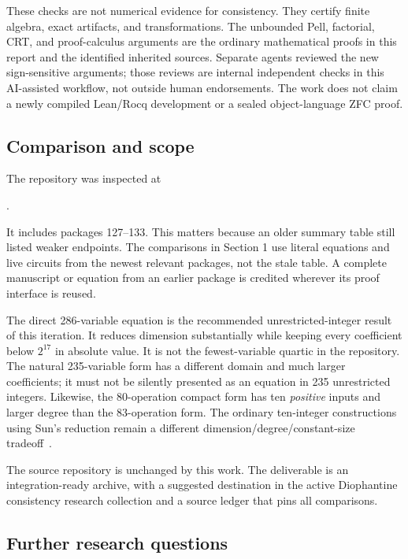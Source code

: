 These checks are not numerical evidence for consistency. They certify
finite algebra, exact artifacts, and transformations. The unbounded
Pell, factorial, CRT, and proof-calculus arguments are the ordinary
mathematical proofs in this report and the identified inherited sources.
Separate agents reviewed the new sign-sensitive arguments; those reviews
are internal independent checks in this AI-assisted workflow, not outside
human endorsements. The work does not claim a newly compiled Lean/Rocq
development or a sealed object-language ZFC proof.

\subsection{Comparison and scope}

The repository was inspected at
\begin{center}\small
{}.
\end{center}
It includes packages 127--133. This matters because an older summary table
still listed weaker endpoints. The comparisons in Section 1 use literal
equations and live circuits from the newest relevant packages, not the
stale table. A complete manuscript or equation from an earlier package is
credited wherever its proof interface is reused.

The direct 286-variable equation is the recommended unrestricted-integer
result of this iteration. It reduces dimension substantially while keeping
every coefficient below $2^{17}$ in absolute value. It is not the
fewest-variable quartic in the repository. The natural 235-variable form
has a different domain and much larger coefficients; it must not be
silently presented as an equation in 235 unrestricted integers. Likewise,
the 80-operation compact form has ten \emph{positive} inputs and larger
degree than the 83-operation form. The ordinary ten-integer constructions
using Sun's reduction remain a different dimension/degree/constant-size
tradeoff~\cite{sun}.

The source repository is unchanged by this work. The deliverable is an
integration-ready archive, with a suggested destination in the active
Diophantine consistency research collection and a source ledger that pins
all comparisons.

\subsection{Further research questions}

